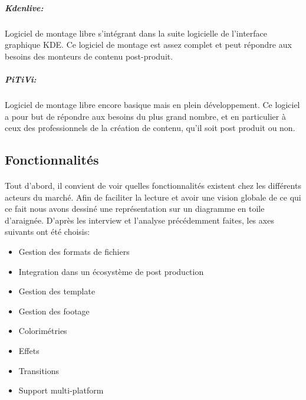 \subparagraph{Kdenlive:}

Logiciel de montage libre s'intégrant dans la suite logicielle de
l'interface graphique KDE.  Ce logiciel de montage est assez complet et
peut répondre aux besoins des monteurs de contenu post-produit.

\subparagraph{PiTiVi:}

Logiciel de montage libre encore basique mais en plein développement.
Ce logiciel a pour but de répondre aux besoins du plus grand nombre,
et en particulier à ceux des professionnels de la création de contenu,
qu'il soit post produit ou non.


\subsection{Fonctionnalités}

\paragraph{}

Tout d'abord, il convient de voir quelles fonctionnalités existent
chez les différents acteurs du marché. Afin de faciliter la lecture
et avoir une vision globale de ce qui ce fait nous avons dessiné une
représentation sur un diagramme en toile d'araignée.  D'après les
interview et l'analyse précédemment faites, les axes suivants ont
été choisis:

\begin{itemize} \setlength{\itemsep}{2mm}

  \item{Gestion des formats de fichiers}

  \item{Integration dans un écosystème de post production}

  \item{Gestion des template}

  \item{Gestion des footage}

  \item{Colorimétries}

  \item{Effets}

  \item{Transitions}

  \item{Support multi-platform}

\end {itemize}

